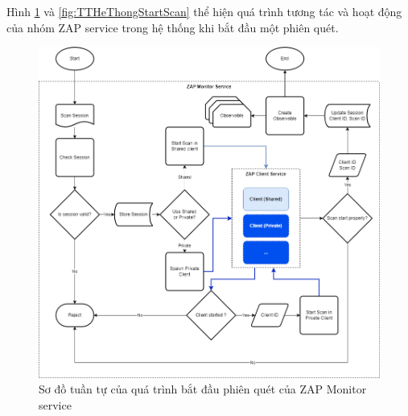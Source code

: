 Hình \ref{fig:TTZapMonitorStartScan} và \ref{fig:TTHeThongStartScan} thể hiện quá trình tương tác và hoạt động của nhóm ZAP service trong hệ thống khi bắt đầu một phiên quét.

\begin{figure}[H]
      \centering
      \includegraphics[width=\textwidth]{applied-thesis-chapters/chapter-3/Sơ đồ tuần tự của quá trình bắt đầu phiên quét của ZAP Monitor service.png}
      \caption{Sơ đồ tuần tự của quá trình bắt đầu phiên quét của ZAP Monitor service}
      \label{fig:TTZapMonitorStartScan}
\end{figure}


